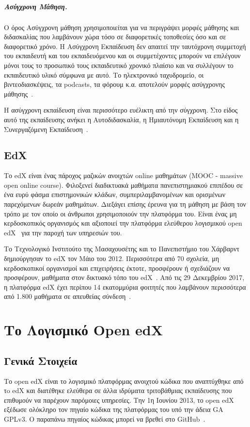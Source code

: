 \documentclass[12pt]{report}
\begin{document}
  \paragraph{Ασύγχρονη Μάθηση.} Ο όρος Ασύγχρονη μάθηση χρησιμοποιείται για να περιγράψει μορφές μάθησης και διδασκαλίας που λαμβάνουν χώρα τόσο σε διαφορετικές τοποθεσίες όσο και σε διαφορετικό χρόνο. Η Ασύγχρονη Εκπαίδευση δεν απαιτεί την ταυτόχρονη συμμετοχή του εκπαιδευτή και του εκπαιδευόμενου και οι συμμετέχοντες μπορούν να επιλέγουν μόνοι τους το προσωπικό τους εκπαιδευτικό χρονικό πλαίσιο και να συλλέγουν το εκπαιδευτικό υλικό σύμφωνα με αυτό. Το ηλεκτρονικό ταχυδρομείο, οι βιντεοδιασκέψεις, τα \textlatin{podcasts}, τα φόρουμ κ.α. αποτελούν μορφές ασύγχρονης μάθησης~\cite{hrastinski}.

Η ασύγχρονη εκπαίδευση είναι περισσότερο ευέλικτη από την σύγχρονη. Στο είδος αυτό της εκπαίδευσης ανήκει η Αυτοδιδασκαλία, η Ημιαυτόνομη Εκπαίδευση και η Συνεργαζόμενη Εκπαίδευση~\cite{wikipedia_2018_1}.

\section{\textlatin{EdX}}
Το \textlatin{edX} είναι ένας πάροχος μαζικών ανοιχτών \textlatin{online} μαθημάτων (\textlatin{MOOC - massive open online course}). Φιλοξενεί διαδικτυακά μαθήματα πανεπιστημιακού επιπέδου σε ένα ευρύ φάσμα επιστημονικών κλάδων, συμπεριλαμβανομένων και ορισμένων παρεχόμενων δωρεάν μαθημάτων. Διεξάγει επίσης έρευνα για τη μάθηση με βάση τον τρόπο με τον οποίο οι άνθρωποι χρησιμοποιούν την πλατφόρμα του. Είναι ένας μη κερδοσκοπικός οργανισμός και αξιοποιεί την πλατφόρμα ελεύθερου λογισμικού \textlatin{open edX}~\cite{edx_2018} για την παροχή των υπηρεσιών του.

Το Τεχνολογικό Ινστιτούτο της Μασαχουσέτης και το Πανεπιστήμιο του Χάρβαρντ δημιούργησαν το \textlatin{edX} τον Μάιο του 2012. Περισσότερα από 70 σχολεία, μη κερδοσκοπικοί οργανισμοί και επιχειρήσεις έκτοτε, προσφέρουν ή σχεδιάζουν να προσφέρουν, μαθήματα στον δικτυακό τόπο του \textlatin{edX}~\cite{edx_2019_1}. Από τις 29 Δεκεμβρίου 2017, η πλατφόρμα \textlatin{edX} έχει περίπου 14 εκατομμύρια φοιτητές που λαμβάνουν περισσότερα από 1.800 μαθήματα σε απευθείας σύνδεση~\cite{report_2018}.


\chapter{Το Λογισμικό \textlatin{Open edX}}\label{ch2}
\section{Γενικά Στοιχεία}
Το \textlatin{open edX} είναι το λογισμικό πλατφόρμας ανοιχτού κώδικα που αναπτύχθηκε από τo \textlatin{edX} και διατέθηκε ελεύθερα σε άλλα ιδρύματα τριτοβάθμιας εκπαίδευσης που επιθυμούν να παρέχουν παρόμοιες υπηρεσίες. Την 1η Ιουνίου 2013, το \textlatin{open edX} εξέδωσε ολόκληρο τον πηγαίο κώδικα της πλατφόρμας του υπό την άδεια \textlatin{GA GPLv3}. Ο παραπάνω πηγαίος κώδικας μπορεί να βρεθεί στο \textlatin{GitHub}~\cite{edx_2019_2}.
\end{document}
